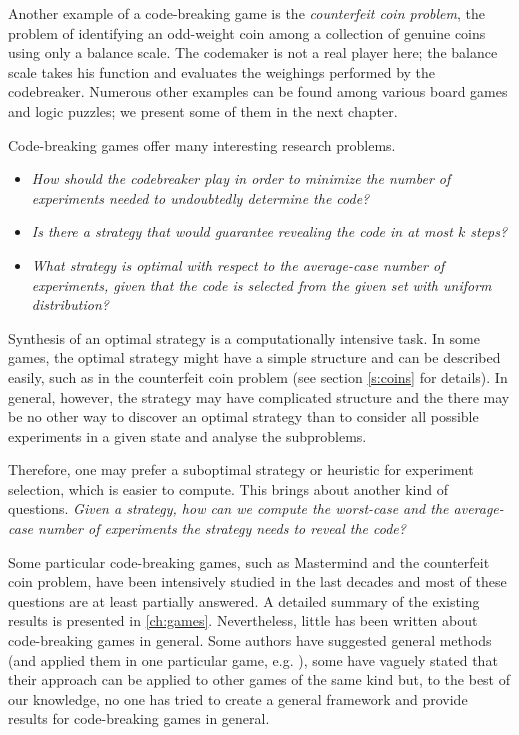 Another example of a code-breaking game is the \emph{counterfeit coin problem},
  the problem of identifying an odd-weight coin among
  a collection of genuine coins using only a balance scale.
The codemaker is not a real player here; the balance scale takes his function
  and evaluates the weighings performed by the codebreaker.
Numerous other examples can be found among various board games and logic puzzles;
 we present some of them in the next chapter.

Code-breaking games offer many interesting research problems.

\begin{itemize}
\item \emph{How should the codebreaker play in order to minimize the number of experiments
   needed to undoubtedly determine the code?}
\item \emph{Is there a strategy that would guarantee
   revealing the code in at most $k$ steps?}
\item \emph{What strategy is optimal with respect
   to the average-case number of experiments,
   given that the code is selected
   from the given set with uniform distribution?}
\end{itemize}

Synthesis of an optimal strategy is a computationally intensive task.
In some games, the optimal strategy might have a simple
  structure and can be described easily, such as in
  the counterfeit coin problem (see section \autoref{s:coins} for details).
In general, however, the strategy may have complicated structure and
  the there may be no other way to discover an optimal strategy
  than to consider all possible experiments
  in a given state and analyse the subproblems.

Therefore, one may prefer a suboptimal strategy or heuristic
  for experiment selection, which is easier to compute.
This brings about another kind of questions.
\emph{Given a strategy,
  how can we compute the worst-case and the average-case number
  of experiments the strategy needs to reveal the code?}

Some particular code-breaking games,
  such as Mastermind and the counterfeit coin problem,
  have been intensively studied in the last decades
  and most of these questions are at least partially answered.
A detailed summary of the existing results is presented in \autoref{ch:games}.
Nevertheless, little has been written about code-breaking games in general.
Some authors have suggested general methods (and applied them in one particular game,
  e.g. \cite{cbg-stgopt, cbg-gen}),
  some have vaguely stated that their approach can be applied
  to other games of the same kind but,
  to the best of our knowledge, no one has tried to
  create a general framework and provide
   results for code-breaking games in general.


